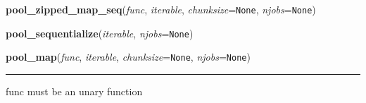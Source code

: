 \hspace{.8\funcindent}\begin{boxedminipage}{\funcwidth}

    \raggedright \textbf{pool\_zipped\_map\_seq}(\textit{func}, \textit{iterable}, \textit{chunksize}={\tt None}, \textit{njobs}={\tt None})

\setlength{\parskip}{2ex}
\setlength{\parskip}{1ex}
    \end{boxedminipage}

    \label{pycosmicstar:parallellistcompreension:pool_sequentialize}

    \vspace{0.5ex}

\hspace{.8\funcindent}\begin{boxedminipage}{\funcwidth}

    \raggedright \textbf{pool\_sequentialize}(\textit{iterable}, \textit{njobs}={\tt None})

\setlength{\parskip}{2ex}
\setlength{\parskip}{1ex}
    \end{boxedminipage}

    \label{pycosmicstar:parallellistcompreension:pool_map}

    \vspace{0.5ex}

\hspace{.8\funcindent}\begin{boxedminipage}{\funcwidth}

    \raggedright \textbf{pool\_map}(\textit{func}, \textit{iterable}, \textit{chunksize}={\tt None}, \textit{njobs}={\tt None})

    \vspace{-1.5ex}

    \rule{\textwidth}{0.5\fboxrule}
\setlength{\parskip}{2ex}
    func must be an unary function

\setlength{\parskip}{1ex}
    \end{boxedminipage}

    \label{pycosmicstar:parallellistcompreension:pool_zipped_map}

